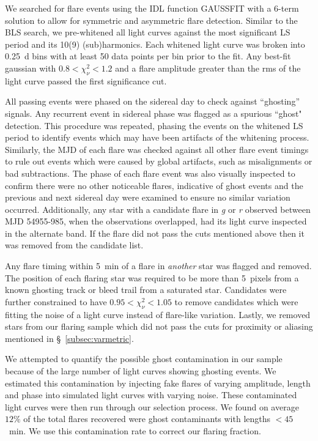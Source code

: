 We searched for flare events using the IDL function GAUSSFIT with a 6-term solution to allow for symmetric and asymmetric flare detection. Similar to the BLS search, we pre-whitened all light curves against the most significant LS period and its 10(9) (sub)harmonics. Each whitened light curve was broken into 0.25~d bins with at least 50 data points per bin prior to the fit. Any best-fit gaussian with $0.8<\chi^2_{\nu}<1.2$ and a flare amplitude greater than the rms of the light curve passed the first significance cut. 

All passing events were phased on the sidereal day to check against ``ghosting'' signals. Any recurrent event in sidereal phase was flagged as a spurious ``ghost" detection. This procedure was repeated, phasing the events on the whitened LS period to identify events which may have been artifacts of the whitening process. Similarly, the MJD of each flare was checked against all other flare event timings to rule out events which were caused by global artifacts, such as misalignments or bad subtractions. The phase of each flare event was also visually inspected to confirm there were no other noticeable flares, indicative of ghost events and the previous and next sidereal day were examined to ensure no similar variation occurred. Additionally, any star with a candidate flare in \textit{g} or \textit{r} observed between MJD 54955-985, when the observations overlapped, had its light curve inspected in the alternate band. If the flare did not pass the cuts mentioned above then it was removed from the candidate list.

Any flare timing within 5~min of a flare in \textit{another} star was flagged and removed. The position of each flaring star was required to be more than 5~pixels from a known ghosting track or bleed trail from a saturated star. Candidates were further constrained to have $0.95<\chi^2_{\nu}<1.05$ to remove candidates which were fitting the noise of a light curve instead of flare-like variation. Lastly, we removed stars from our flaring sample which did not pass the cuts for proximity or aliasing mentioned in  \S~\ref{subsec:varmetric}.

We attempted to quantify the possible ghost contamination in our sample because of the large number of light curves showing ghosting events. We estimated this contamination by injecting fake flares of varying amplitude, length and phase into simulated light curves with varying noise. These contaminated light curves were then run through our selection process. We found on average $12\%$ of the total flares recovered were ghost contaminants with lengths $<45$~min. We use this contamination rate to correct our flaring fraction.

